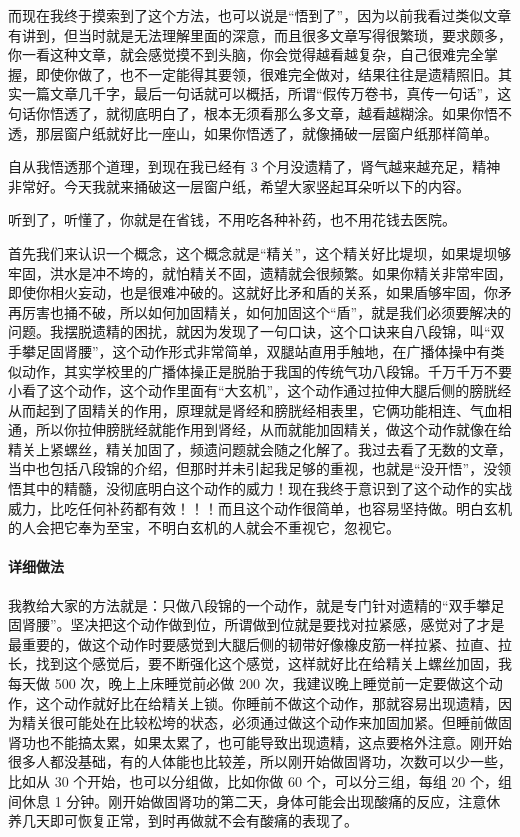 \documentclass{ctexart}
\begin{document}
而现在我终于摸索到了这个方法，也可以说是“悟到了”，因为以前我看过类似文章有讲到，但当时就是无法理解里面的深意，而且很多文章写得很繁琐，要求颇多，你一看这种文章，就会感觉摸不到头脑，你会觉得越看越复杂，自己很难完全掌握，即使你做了，也不一定能得其要领，很难完全做对，结果往往是遗精照旧。其实一篇文章几千字，最后一句话就可以概括，所谓“假传万卷书，真传一句话”，这句话你悟透了，就彻底明白了，根本无须看那么多文章，越看越糊涂。如果你悟不透，那层窗户纸就好比一座山，如果你悟透了，就像捅破一层窗户纸那样简单。

自从我悟透那个道理，到现在我已经有 3 个月没遗精了，肾气越来越充足，精神非常好。今天我就来捅破这一层窗户纸，希望大家竖起耳朵听以下的内容。

听到了，听懂了，你就是在省钱，不用吃各种补药，也不用花钱去医院。

首先我们来认识一个概念，这个概念就是“精关”，这个精关好比堤坝，如果堤坝够牢固，洪水是冲不垮的，就怕精关不固，遗精就会很频繁。如果你精关非常牢固，即使你相火妄动，也是很难冲破的。这就好比矛和盾的关系，如果盾够牢固，你矛再厉害也捅不破，所以如何加固精关，如何加固这个“盾”，就是我们必须要解决的问题。我摆脱遗精的困扰，就因为发现了一句口诀，这个口诀来自八段锦，叫“双手攀足固肾腰”，这个动作形式非常简单，双腿站直用手触地，在广播体操中有类似动作，其实学校里的广播体操正是脱胎于我国的传统气功八段锦。千万千万不要小看了这个动作，这个动作里面有“大玄机”，这个动作通过拉伸大腿后侧的膀胱经从而起到了固精关的作用，原理就是肾经和膀胱经相表里，它俩功能相连、气血相通，所以你拉伸膀胱经就能作用到肾经，从而就能加固精关，做这个动作就像在给精关上紧螺丝，精关加固了，频遗问题就会随之化解了。我过去看了无数的文章，当中也包括八段锦的介绍，但那时并未引起我足够的重视，也就是“没开悟”，没领悟其中的精髓，没彻底明白这个动作的威力！现在我终于意识到了这个动作的实战威力，比吃任何补药都有效！！！而且这个动作很简单，也容易坚持做。明白玄机的人会把它奉为至宝，不明白玄机的人就会不重视它，忽视它。

\paragraph{详细做法}

我教给大家的方法就是：只做八段锦的一个动作，就是专门针对遗精的“双手攀足固肾腰”。坚决把这个动作做到位，所谓做到位就是要找对拉紧感，感觉对了才是最重要的，做这个动作时要感觉到大腿后侧的韧带好像橡皮筋一样拉紧、拉直、拉长，找到这个感觉后，要不断强化这个感觉，这样就好比在给精关上螺丝加固，我每天做 500 次，晚上上床睡觉前必做 200 次，我建议晚上睡觉前一定要做这个动作，这个动作就好比在给精关上锁。你睡前不做这个动作，那就容易出现遗精，因为精关很可能处在比较松垮的状态，必须通过做这个动作来加固加紧。但睡前做固肾功也不能搞太累，如果太累了，也可能导致出现遗精，这点要格外注意。刚开始很多人都没基础，有的人体能也比较差，所以刚开始做固肾功，次数可以少一些，比如从 30 个开始，也可以分组做，比如你做 60 个，可以分三组，每组 20 个，组间休息 1 分钟。刚开始做固肾功的第二天，身体可能会出现酸痛的反应，注意休养几天即可恢复正常，到时再做就不会有酸痛的表现了。
\end{document}
